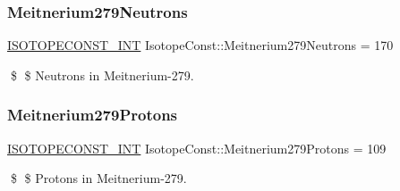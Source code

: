 \subsubsection{\texorpdfstring{Meitnerium279\+Neutrons}{Meitnerium279Neutrons}}
{\footnotesize\ttfamily \mbox{\hyperlink{group___isotope_const-_macros_ga5f18360b3e99483a35c32d789e62621c}{I\+S\+O\+T\+O\+P\+E\+C\+O\+N\+S\+T\+\_\+\+I\+NT}} Isotope\+Const\+::\+Meitnerium279\+Neutrons = 170}

\$ \$ Neutrons in Meitnerium-\/279. \mbox{\label{group___isotope_const-_meitnerium-_mt279_gaa4fd0b842854805b582514f45b2dc80a}} 
\subsubsection{\texorpdfstring{Meitnerium279\+Protons}{Meitnerium279Protons}}
{\footnotesize\ttfamily \mbox{\hyperlink{group___isotope_const-_macros_ga5f18360b3e99483a35c32d789e62621c}{I\+S\+O\+T\+O\+P\+E\+C\+O\+N\+S\+T\+\_\+\+I\+NT}} Isotope\+Const\+::\+Meitnerium279\+Protons = 109}

\$ \$ Protons in Meitnerium-\/279. 